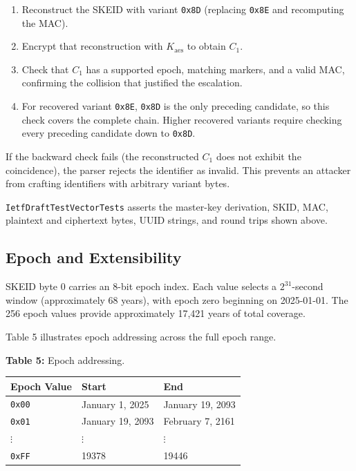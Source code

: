 \documentclass[fleqn,10pt]{wlpeerj}
\newcounter{none} %
\providecommand{\tightlist}{%
  \setlength{\itemsep}{0pt}\setlength{\parskip}{0pt}}
\begin{document}
\begin{enumerate}
\def\labelenumi{\arabic{enumi}.}
\tightlist
\item
  Reconstruct the SKEID with variant \texttt{0x8D} (replacing
  \texttt{0x8E} and recomputing the MAC).
\item
  Encrypt that reconstruction with \(K_{\mathrm{aes}}\) to obtain
  \(C_1\).
\item
  Check that \(C_1\) has a supported epoch, matching markers, and a
  valid MAC, confirming the collision that justified the escalation.
\item
  For recovered variant \texttt{0x8E}, \texttt{0x8D} is the only
  preceding candidate, so this check covers the complete chain. Higher
  recovered variants require checking every preceding candidate down to
  \texttt{0x8D}.
\end{enumerate}

If the backward check fails (the reconstructed \(C_1\) does not exhibit
the coincidence), the parser rejects the identifier as invalid. This
prevents an attacker from crafting identifiers with arbitrary variant
bytes.

\texttt{IetfDraftTestVectorTests} asserts the master-key derivation,
SKID, MAC, plaintext and ciphertext bytes, UUID strings, and round trips
shown above.

\subsection{Epoch and Extensibility}\label{epoch-and-extensibility}

SKEID byte 0 carries an 8-bit epoch index. Each value selects a
\(2^{31}\)-second window (approximately 68 years), with epoch zero
beginning on 2025-01-01. The 256 epoch values provide approximately
17,421 years of total coverage.

Table 5 illustrates epoch addressing across the full epoch range.

\textbf{Table 5:} Epoch addressing.

{\def\LTcaptype{none} %
\begin{longtable}[]{@{}lll@{}}
\toprule\noalign{}
Epoch Value & Start & End \\
\midrule\noalign{}
\endhead
\bottomrule\noalign{}
\endlastfoot
\texttt{0x00} & January 1, 2025 & January 19, 2093 \\
\texttt{0x01} & January 19, 2093 & February 7, 2161 \\
\(\vdots\) & \(\vdots\) & \(\vdots\) \\
\texttt{0xFF} & 19378 & 19446 \\
\end{longtable}
}
\end{document}

